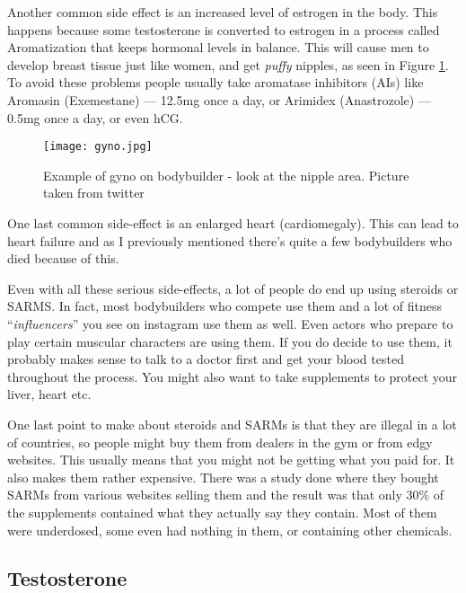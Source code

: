 \documentclass[openany, 12pt]{book}
\begin{document}
        Another common side effect is an increased level of estrogen in the body. This happens because some testosterone is converted to estrogen in a process called Aromatization
        that keeps hormonal levels in balance. This will cause men to develop breast tissue just like women, and get 
        \textit{puffy} nipples, as seen in Figure \ref{fig8}. To avoid these problems people usually take aromatase inhibitors (AIs) like Aromasin (Exemestane) --- 12.5mg once a day, or
        Arimidex (Anastrozole) --- 0.5mg once a day, or even hCG.

	\begin{figure}[h]
		\centering
		\texttt{[image: gyno.jpg]}
		\caption{Example of gyno on bodybuilder - look at the nipple area. Picture taken from twitter}
		\label{fig8}
	\end{figure}

        One last common side-effect is an enlarged heart (cardiomegaly). This can lead to heart failure and as I previously mentioned there's quite a few bodybuilders who died because of this.
        
        Even with all these serious side-effects, a lot of people do end up using steroids or SARMS. In fact, most bodybuilders who compete use them
        and a lot of fitness ``\textit{influencers}''
        you see on instagram use them as well. Even actors who prepare to play certain muscular characters are using them. If you do decide to use them, it probably makes sense to talk to a
        doctor first and get your blood tested throughout the process. You might also want to take supplements to protect your liver, heart etc.

        One last point to make about steroids and SARMs is that they are illegal in a lot of countries, so people might buy them from dealers in the gym or from edgy websites. This usually means
        that you might not be getting what you paid for. It also makes them rather expensive. There was a study done where they bought SARMs from various websites selling them and the result was that
        only 30\% of the supplements contained what they actually say they contain.
        Most of them were underdosed, some even had nothing in them, or containing other chemicals.

        \subsection{Testosterone}
        
\end{document}

